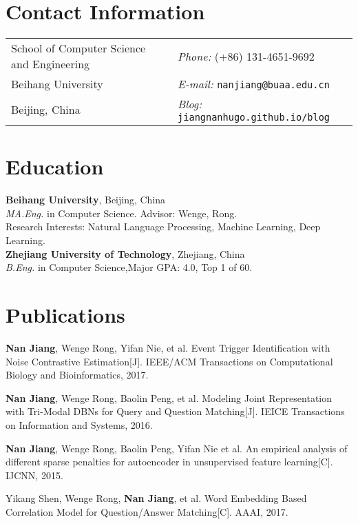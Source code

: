 \documentclass[margin,line]{resume}
\begin{document}

\begin{resume}
\section{Contact Information}
\begin{tabular}{@{}p{3in}p{3in}}
School of Computer Science and Engineering & {\it Phone:}  (+86) 131-4651-9692 \\
Beihang University                         & {\it E-mail:}  {\tt nanjiang@buaa.edu.cn} \\
Beijing, China                             & {\it Blog:} {\tt jiangnanhugo.github.io/blog} \\
\end{tabular}


\section{Education}
{\bf Beihang University}, Beijing,  China\\
\emph{MA.Eng.} in Computer Science. Advisor:  Wenge, Rong.\\
 Research Interests: Natural Language Processing, Machine Learning, Deep Learning. \\


{\bf Zhejiang University of Technology}, Zhejiang, China\\
\emph{B.Eng.} in Computer Science,\space Major GPA: 4.0, Top 1 of 60.




\section{Publications}
\textbf{Nan Jiang}, Wenge Rong, Yifan Nie, et al. Event Trigger Identification with Noise Contrastive Estimation[J]. IEEE/ACM Transactions on Computational Biology and Bioinformatics, 2017.

\textbf{Nan Jiang}, Wenge Rong, Baolin Peng, et al. Modeling Joint Representation with Tri-Modal DBNs for Query and Question Matching[J]. IEICE Transactions on Information and Systems, 2016.

\textbf{Nan Jiang}, Wenge Rong, Baolin Peng, Yifan Nie et al. An empirical analysis of different sparse penalties for autoencoder in unsupervised feature learning[C]. IJCNN, 2015.

Yikang Shen, Wenge Rong, \textbf{Nan Jiang}, et al. Word Embedding Based Correlation Model for Question/Answer Matching[C]. AAAI, 2017.


\end{resume}
\end{document}
